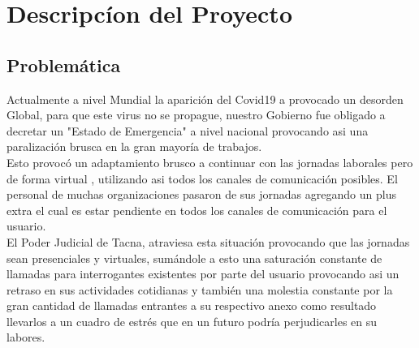 \documentclass[twoside,twocolumn]{article}
\begin{document}
\section{Descripcíon del Proyecto}
\subsection{Problemática}
Actualmente a nivel Mundial la aparición del Covid19 a provocado un desorden Global, para que este virus no se propague, nuestro Gobierno fue obligado a decretar un "Estado de Emergencia" a nivel nacional provocando asi una paralización brusca en la gran mayoría de trabajos.
\\
Esto provocó un adaptamiento brusco a continuar con las jornadas laborales pero de forma virtual , utilizando asi todos los canales de comunicación posibles.
El personal de muchas organizaciones pasaron de sus jornadas agregando un plus extra el cual es estar pendiente en todos los canales de comunicación para el usuario.
\\
El Poder Judicial de Tacna, atraviesa esta situación provocando que las jornadas sean presenciales y virtuales, sumándole a esto una saturación constante de llamadas para  interrogantes existentes por parte del usuario provocando asi un retraso en sus actividades cotidianas y también una molestia constante por la gran cantidad de llamadas entrantes a su respectivo anexo como resultado llevarlos a un cuadro de estrés que en un futuro podría perjudicarles en su labores.
\end{document}
